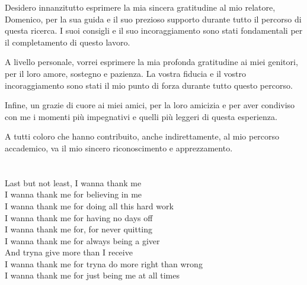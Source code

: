 
%

\begin{ntacknowledgements}

Desidero innanzitutto esprimere la mia sincera gratitudine al mio relatore, Domenico, per la sua guida e il suo prezioso supporto durante tutto il percorso di questa ricerca. I suoi consigli e il suo incoraggiamento sono stati fondamentali per il completamento di questo lavoro.

A livello personale, vorrei esprimere la mia profonda gratitudine ai miei genitori, per il loro amore, sostegno e pazienza. La vostra fiducia e il vostro incoraggiamento sono stati il mio punto di forza durante tutto questo percorso.

Infine, un grazie di cuore ai miei amici, per la loro amicizia e per aver condiviso con me i momenti più impegnativi e quelli più leggeri di questa esperienza.

A tutti coloro che hanno contribuito, anche indirettamente, al mio percorso accademico, va il mio sincero riconoscimento e apprezzamento.
\\
\\
\\

\small{
	Last but not least, I wanna thank me\\
I wanna thank me for believing in me\\
I wanna thank me for doing all this hard work\\
I wanna thank me for having no days off\\
I wanna thank me for, for never quitting\\
I wanna thank me for always being a giver\\
And tryna give more than I receive\\
I wanna thank me for tryna do more right than wrong\\
I wanna thank me for just being me at all times\\
}



\end{ntacknowledgements}
